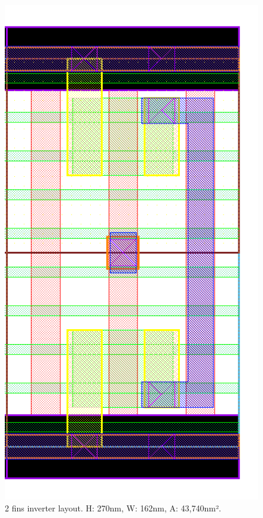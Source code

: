 \documentclass[diss,pgmicro,english]{iiufrgs}
\begin{document}
\begin{figure}[]
\centering
\includegraphics[width=\textwidth,height=\textheight,keepaspectratio]{INV2F.png}
\caption{2 fins inverter layout. H: 270nm, W: 162nm, A: 43,740nm².}
\label{fig:INV2F}
\end{figure}
\end{document}

